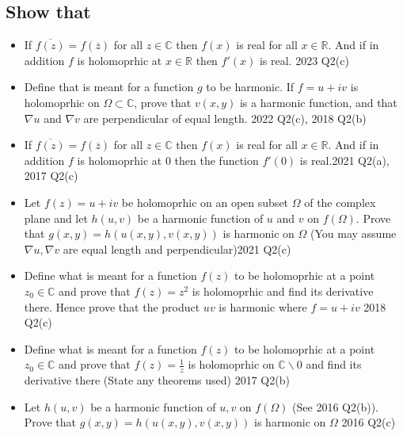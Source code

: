 \documentclass[a4paper, 8pt]{extarticle}
\begin{document}
\subsection{Show that}
\begin{itemize}
    \item If $\overline{f(z)} = f(\overline{z})$ for all $z \in \mathbb{C}$ then $f(x)$ is real for all $x \in \mathbb{R}$. And if in addition $f$ is holomoprhic at $x \in \mathbb{R}$ then $f'(x)$ is real. \hfill 2023 Q2(c)
    \item Define that is meant for a function $g$ to be harmonic. If $f = u +iv$ is holomoprhic on $\Omega \subset \mathbb{C}$, prove that $v(x,y)$ is a harmonic function, and that $\nabla u$ and $\nabla v$ are perpendicular of equal length. \hfill 2022 Q2(c), 2018 Q2(b)
    \item If $\overline{f(z)} = f(\overline{z})$ for all $z \in \mathbb{C}$ then $f(x)$ is real for all $x \in \mathbb{R}$. And if in addition $f$ is holomoprhic at $0$ then the function $f'(0)$ is real.\hfill 2021 Q2(a), 2017 Q2(c)
    \item Let $f(z) = u +iv$ be holomoprhic on an open subset $\Omega$ of the complex plane and let $h(u,v)$ be a harmonic function of $u$ and $v$ on $f(\Omega)$. Prove that $g(x,y) = h(u(x,y), v(x,y))$ is harmonic on $\Omega$ (You may assume $\nabla u, \nabla v$ are equal length and perpendicular)\hfill 2021 Q2(c)
    \item Define what is meant for a function $f(z)$ to be holomoprhic at a point $z_0 \in \mathbb{C}$ and prove that $f(z) = z^2$ is holomoprhic and find its derivative there. Hence prove that the product $uv$ is harmonic where $f=u +iv$ \hfill 2018 Q2(c)
    \item Define what is meant for a function $f(z)$ to be holomoprhic at a point $z_0 \in \mathbb{C}$ and prove that $f(z) = \frac{1}{z}$ is holomoprhic on $\mathbb{C} \backslash 0$ and find its derivative there (State any theorems used) \hfill 2017 Q2(b)
    \item Let $h(u,v)$ be a harmonic function of $u, v$ on $f(\Omega)$ (See 2016 Q2(b)). Prove that $g(x,y) = h(u(x,y), v(x,y))$ is harmonic on $\Omega$ \hfill 2016 Q2(c)
\end{itemize}
\end{document}
